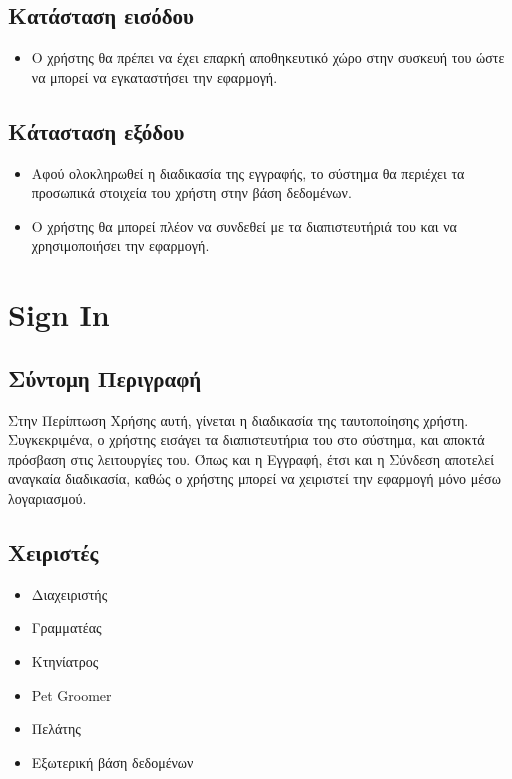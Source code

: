 \documentclass[12pt,a4paper,twoside]{book}
\begin{document}
\subsection{Κατάσταση εισόδου} %
\begin{itemize}
  \item Ο χρήστης θα πρέπει να έχει επαρκή αποθηκευτικό χώρο στην συσκευή του ώστε να μπορεί να εγκαταστήσει την εφαρμογή.%
\end{itemize}

\subsection{Κάτασταση εξόδου} %
\begin{itemize}
  \item Αφού ολοκληρωθεί η διαδικασία της εγγραφής, το σύστημα θα περιέχει τα προσωπικά στοιχεία του χρήστη στην βάση δεδομένων.%
  \item Ο χρήστης θα μπορεί πλέον να συνδεθεί με τα διαπιστευτήριά του και να χρησιμοποιήσει την εφαρμογή. %
\end{itemize}

\section{Sign In} %

\subsection{Σύντομη Περιγραφή}
Στην Περίπτωση Χρήσης αυτή, γίνεται η διαδικασία της ταυτοποίησης χρήστη. Συγκεκριμένα, ο χρήστης εισάγει τα διαπιστευτήρια του στο σύστημα, και αποκτά πρόσβαση στις λειτουργίες του. Όπως και η Εγγραφή, έτσι και η Σύνδεση αποτελεί αναγκαία διαδικασία, καθώς ο χρήστης μπορεί να χειριστεί την εφαρμογή μόνο μέσω λογαριασμού.%

\subsection{Χειριστές}
\begin{itemize}
  \item Διαχειριστής
  \item Γραμματέας
  \item Κτηνίατρος
  \item Pet Groomer
  \item Πελάτης
  \item Εξωτερική βάση δεδομένων %
\end{itemize}
\end{document}
